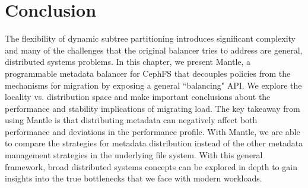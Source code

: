 \section{Conclusion}
The flexibility of dynamic subtree partitioning introduces significant complexity and many of the challenges that the original balancer tries to address are general, distributed systems problems. In this chapter, we present Mantle, a programmable metadata balancer for CephFS that decouples policies from the mechanisms for migration by exposing a general ``balancing" API. We explore the locality vs. distribution space and make important conclusions about the performance and stability implications of migrating load. The key takeaway from using Mantle is that distributing metadata can negatively affect both performance and deviations in the performance profile. With Mantle, we are able to compare the strategies for metadata distribution instead of the other metadata management strategies in the underlying file system. With this general framework, broad distributed systems concepts can be explored in depth to gain insights into the true bottlenecks that we face with modern workloads.
